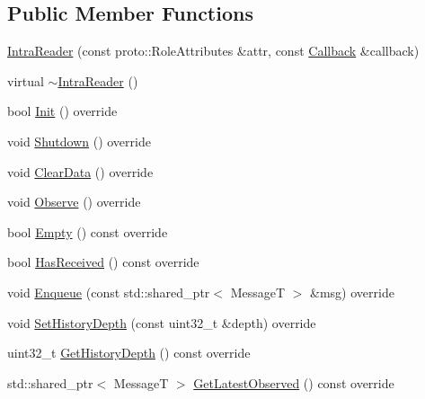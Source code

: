 \subsection*{Public Member Functions}
\begin{DoxyCompactItemize}
\item 
\hyperlink{classapollo_1_1cyber_1_1blocker_1_1IntraReader_a591de348f97ac5ec0e378e1fb92c617d}{Intra\-Reader} (const proto\-::\-Role\-Attributes \&attr, const \hyperlink{classapollo_1_1cyber_1_1blocker_1_1IntraReader_a15cf88ac9399d324aeb685bec11c8afe}{Callback} \&callback)
\item 
virtual \hyperlink{classapollo_1_1cyber_1_1blocker_1_1IntraReader_a0921409f222aec564d34d8814dd94266}{$\sim$\-Intra\-Reader} ()
\item 
bool \hyperlink{classapollo_1_1cyber_1_1blocker_1_1IntraReader_a43e61ca2814c9ca792b89c67e2a02daf}{Init} () override
\item 
void \hyperlink{classapollo_1_1cyber_1_1blocker_1_1IntraReader_a4f6fb242d33858198474001f855626dc}{Shutdown} () override
\item 
void \hyperlink{classapollo_1_1cyber_1_1blocker_1_1IntraReader_a10695c39f2444febe5963747a578df29}{Clear\-Data} () override
\item 
void \hyperlink{classapollo_1_1cyber_1_1blocker_1_1IntraReader_a8f509c61e3b4b406cbe2beb53558e821}{Observe} () override
\item 
bool \hyperlink{classapollo_1_1cyber_1_1blocker_1_1IntraReader_a69f5c5029cba88c2a23528efe6a69457}{Empty} () const override
\item 
bool \hyperlink{classapollo_1_1cyber_1_1blocker_1_1IntraReader_a398c31e1c4918adc42e771e183eb244a}{Has\-Received} () const override
\item 
void \hyperlink{classapollo_1_1cyber_1_1blocker_1_1IntraReader_a2c155cd435cacc890cbffc4e0a3299e7}{Enqueue} (const std\-::shared\-\_\-ptr$<$ Message\-T $>$ \&msg) override
\item 
void \hyperlink{classapollo_1_1cyber_1_1blocker_1_1IntraReader_a699f5630c23afb609aa55a63528d2361}{Set\-History\-Depth} (const uint32\-\_\-t \&depth) override
\item 
uint32\-\_\-t \hyperlink{classapollo_1_1cyber_1_1blocker_1_1IntraReader_adb4056ff1f7ed30e7fbff720fb85887a}{Get\-History\-Depth} () const override
\item 
std\-::shared\-\_\-ptr$<$ Message\-T $>$ \hyperlink{classapollo_1_1cyber_1_1blocker_1_1IntraReader_a85adf523b69aa8a0ca72f801c07486fc}{Get\-Latest\-Observed} () const override

\end{DoxyCompactItemize}
